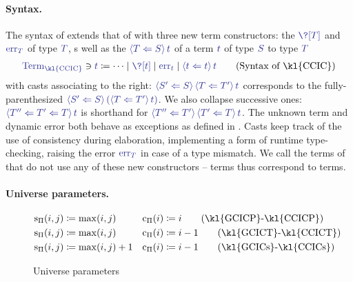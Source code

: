 \paragraph{Syntax.}
The syntax of %
extends that of 
with three new term constructors: the  $\tcol{\?[T]}$ and
 $\tcol{\err[T]}$ of type $\tcol{T}$, 
s well as the  $\tcol{\cast{S}{T}{t}}$
of a term $\tcol{t}$ of type $\tcol{S}$ to type $\tcol{T}$
%
\begin{align}
  \label{fig:syntax-castcic}
  \tcol{\terms{\kl{CCIC}}} \ni \tcol{t} \coloneqq \dots \mid \tcol{\?[t]} \mid \tcol{\err[t]} \mid \tcol{\cast{t}{t}{t}} \tag{Syntax of \kl{CCIC}}
\end{align}
%
with casts associating to the right:
$\tcol{\cast{S}{S'}{\cast{T'}{T}{t}}}$ corresponds to the fully-parenthesized
$\tcol{\cast{S}{S'}{\left(\cast{T'}{T}{t}\right)}}$.
We also collapse successive ones:
$\tcol{\cast{T}{T'' \Leftarrow T'}{t}}$ is shorthand for
$\tcol{\cast{T'}{T''}{\cast{T}{T'}{t}}}$.
The unknown term and dynamic error both behave as exceptions as
defined in  .
%
Casts keep track of the use of consistency during elaboration, implementing
a form of runtime type-checking, raising the error $\tcol{\err[T]}$ in case of a type mismatch.
%
We call  the terms of  that do not use any of these new
constructors –   terms thus correspond to  terms.

\paragraph{Universe parameters.}

\begin{figure}
\begin{align}
\sortOfPi{i}{j} &\coloneqq \max(i,j) &  \castOfPi{i} &\coloneqq i \label{eq:spi-cpi-gcicp}\tag{\text{\kl{GCICP}-\kl{CCICP}}}\\
\sortOfPi{i}{j} &\coloneqq \max(i,j) & \castOfPi{i} &\coloneqq i-1 \label{eq:spi-cpi-gcict}\tag{\text{\kl{GCICT}-\kl{CCICT}}}\\
\sortOfPi{i}{j} &\coloneqq \max(i,j)+1 &  \castOfPi{i} &\coloneqq i-1 \label{eq:spi-cpi-gcics}\tag{\text{\kl{GCICs}-\kl{CCICs}}}
\end{align}
	\caption{Universe parameters}
	\label{fig:univ-param}
\end{figure}


